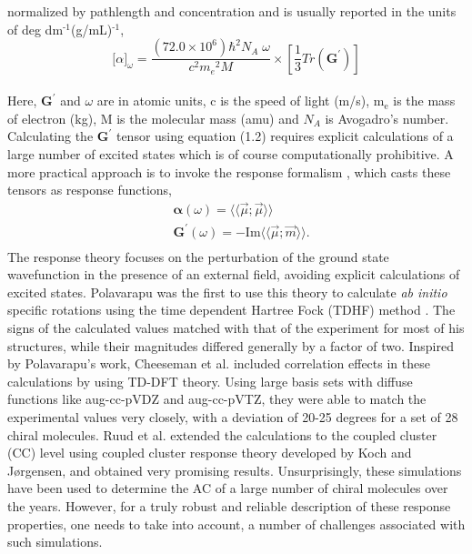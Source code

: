 normalized by pathlength and concentration and is usually reported in the units of deg dm$^{\text{-1}}$(g/mL)$^{\text{-1}}$,\cite{Crawford06}
\\
\begin{equation}
{\lbrack\alpha\rbrack}_{\omega} = \frac{(72.0 \times 10^6){\hbar}^2 N_A\;\omega}{c^2{m_e}^2 M} \times \left[ \frac{1}{3}Tr(\textbf{G}^\prime)\right]
\end{equation}
\\
Here, $\textbf{G}^\prime$ and $\omega$ are in atomic units, c is the speed of light (m/s), m$_{\text{e}}$ is the 
mass of electron (kg), M is the molecular mass (amu) and $N_A$ is Avogadro's number. Calculating the 
$\textbf{G}^\prime$ tensor using equation (1.2) requires explicit calculations of a large number of 
excited states which is of course computationally prohibitive. A more practical approach is to invoke the response formalism
\cite{Kobayashi94,Koch90}, which casts these tensors as response functions,
\begin{equation}
\begin{split}
&\bm{\alpha}(\omega) = \langle\langle\vec{\mu};\vec{\mu}\rangle\rangle\\
&\textbf{G}^{\prime}(\omega) = -\text{Im}\langle\langle\vec{\mu};\vec{m}\rangle\rangle.\\
\end{split}
\end{equation} 
The response theory focuses on the perturbation of the ground state wavefunction in the presence of an external 
field, avoiding explicit calculations of excited states. Polavarapu was the first to use this theory to calculate 
{\em ab initio} specific rotations using the time dependent Hartree Fock (TDHF) method \cite{Polavarapu96}. 
The signs of the calculated values matched with that of the experiment for most of his structures, while their magnitudes 
differed generally by a factor of two. Inspired by Polavarapu's work, Cheeseman et al. \cite{Cheeseman00,Stephens01} 
included correlation effects in these calculations by using TD-DFT theory. Using large basis sets with diffuse functions like 
aug-cc-pVDZ and aug-cc-pVTZ,\cite{Dunning89,Kendall92,Woon94} they were able to match the experimental values very closely, with a 
deviation of 20-25 degrees for a set of 28 chiral molecules. Ruud et al. extended the calculations to the coupled cluster (CC)
level using coupled cluster response theory developed by Koch and J{\o}rgensen\cite{Koch90}, and obtained very 
promising results\cite{Ruud03}. Unsurprisingly, these simulations have been used to determine the AC of a large number of 
chiral molecules over the years\cite{Kondru99}. However, for a truly robust and reliable description of these response 
properties, one needs to take into account, a number of challenges associated with such simulations.

